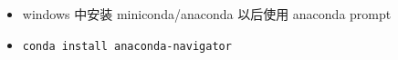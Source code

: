 
\begin{itemize}
\item windows 中安装 miniconda/anaconda 以后使用 anaconda prompt
\item \verb|conda install anaconda-navigator|
\end{itemize}
